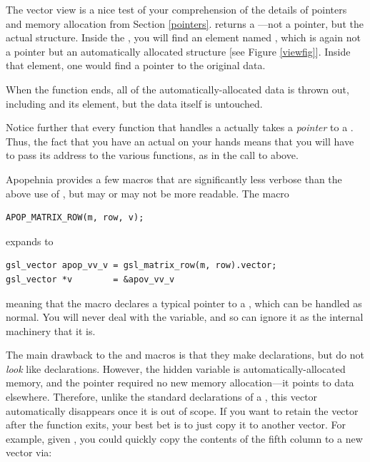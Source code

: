 The vector view is a nice test of your comprehension of the details of
pointers and memory allocation from Section \ref{pointers}.
 returns a
---not a pointer, but the actual
structure.  Inside the , you will find 
an element named , which is again not a pointer but an
automatically allocated structure [see Figure \ref{viewfig}]. Inside that 
element, one would find a pointer to the original data. 

When the function ends, all of the automatically-allocated data is
thrown out, including  and its
 element, but the data itself is untouched.

Notice further that every function that handles a
 actually takes a {\em pointer} to a 
. Thus, the fact that you have an actual 
 on your hands means that you will have to pass
its address to the various functions, as in the call to
 above.

Apopehnia provides a few macros that are significantly less verbose than
the above use of , but may or may not be more
readable. The macro
\begin{lstlisting}
APOP_MATRIX_ROW(m, row, v);
\end{lstlisting}
expands to
\begin{lstlisting}
gsl_vector apop_vv_v = gsl_matrix_row(m, row).vector;
gsl_vector *v        = &apov_vv_v
\end{lstlisting}
meaning that the macro declares a typical pointer to a ,
which can be handled as normal. You will never deal with the
 variable, and so can ignore it as the internal
machinery that it is.

The main drawback to the  and 
macros is that they make declarations, but do not {\em look}
like declarations.  However, the hidden  variable is
automatically-allocated memory, and the  pointer required no new
memory allocation---it points to data elsewhere.  Therefore, unlike the
standard declarations of a , this vector automatically
disappears once it is out of scope.  If you want to retain the vector
after the function exits, your best bet is to just copy it to another
vector. For example, given , you could quickly copy the
contents of the fifth column to a new vector via:

